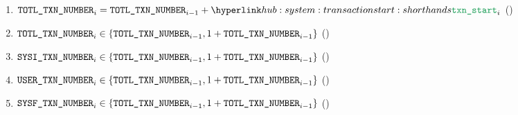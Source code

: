 \begin{enumerate}
	\item $\totalTransactionNumber _{i} = \totalTransactionNumber _{i - 1} + \transactionStart _{i}$ (\sanityCheck)
        \item $\texttt{TOTL}\texttt{\_}\texttt{TXN\_NUMBER} _{i} \in \{ \texttt{TOTL}\texttt{\_}\texttt{TXN\_NUMBER} _{i - 1}, 1 + \texttt{TOTL}\texttt{\_}\texttt{TXN\_NUMBER} _{i - 1} \}$ (\sanityCheck)
        \item $\texttt{SYSI}\texttt{\_}\texttt{TXN\_NUMBER}  _{i} \in \{ \texttt{TOTL}\texttt{\_}\texttt{TXN\_NUMBER} _{i - 1}, 1 + \texttt{TOTL}\texttt{\_}\texttt{TXN\_NUMBER} _{i - 1} \}$ (\sanityCheck)
        \item $\texttt{USER}\texttt{\_}\texttt{TXN\_NUMBER}  _{i} \in \{ \texttt{TOTL}\texttt{\_}\texttt{TXN\_NUMBER} _{i - 1}, 1 + \texttt{TOTL}\texttt{\_}\texttt{TXN\_NUMBER} _{i - 1} \}$ (\sanityCheck)
        \item $\texttt{SYSF}\texttt{\_}\texttt{TXN\_NUMBER}  _{i} \in \{ \texttt{TOTL}\texttt{\_}\texttt{TXN\_NUMBER} _{i - 1}, 1 + \texttt{TOTL}\texttt{\_}\texttt{TXN\_NUMBER} _{i - 1} \}$ (\sanityCheck)
\end{enumerate}
